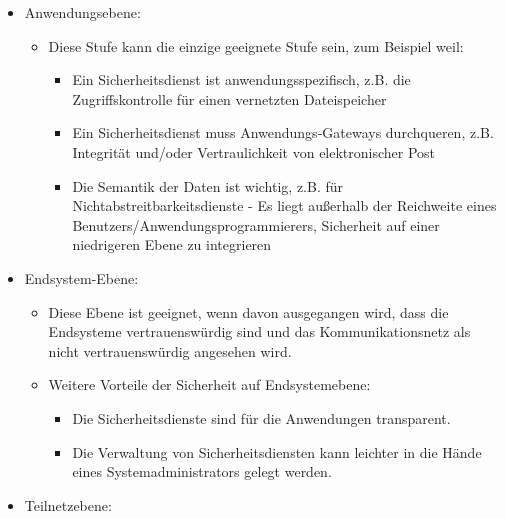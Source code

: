 \documentclass[a4paper]{article}
\begin{document}
\begin{multicols}{3}
    \begin{itemize}
        \item
              Anwendungsebene:

              \begin{itemize}
                  \item
                        Diese Stufe kann die einzige geeignete Stufe sein, zum Beispiel
                        weil:

                        \begin{itemize}
                            \item
                                  Ein Sicherheitsdienst ist anwendungsspezifisch, z.B. die
                                  Zugriffskontrolle für einen vernetzten Dateispeicher
                            \item
                                  Ein Sicherheitsdienst muss Anwendungs-Gateways durchqueren, z.B.
                                  Integrität und/oder Vertraulichkeit von elektronischer Post
                            \item
                                  Die Semantik der Daten ist wichtig, z.B. für
                                  Nichtabstreitbarkeitsdienste - Es liegt außerhalb der Reichweite
                                  eines Benutzers/Anwendungsprogrammierers, Sicherheit auf einer
                                  niedrigeren Ebene zu integrieren
                        \end{itemize}
              \end{itemize}
        \item
              Endsystem-Ebene:

              \begin{itemize}
                  \item
                        Diese Ebene ist geeignet, wenn davon ausgegangen wird, dass die
                        Endsysteme vertrauenswürdig sind und das Kommunikationsnetz als
                        nicht vertrauenswürdig angesehen wird.
                  \item
                        Weitere Vorteile der Sicherheit auf Endsystemebene:

                        \begin{itemize}
                            \item
                                  Die Sicherheitsdienste sind für die Anwendungen transparent.
                            \item
                                  Die Verwaltung von Sicherheitsdiensten kann leichter in die Hände
                                  eines Systemadministrators gelegt werden.
                        \end{itemize}
              \end{itemize}
        \item
              Teilnetzebene:


\end{itemize}
\end{multicols}
\end{document}
